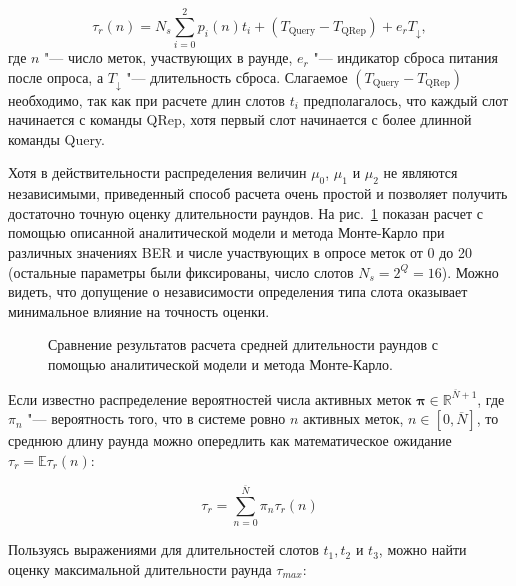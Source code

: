 \begin{equation}\label{eq:ch3_round_duration_of_n}
	\tau_r(n) = N_s \sum\limits_{i=0}^{2}p_i(n)t_i +
		(T_\text{Query} - T_\text{QRep}) +
		e_r T_\downarrow,
\end{equation}
где $n$ "--- число меток, участвующих в раунде, $e_r$ "--- индикатор сброса питания после опроса, а $T_\downarrow$ "--- длительность сброса. Слагаемое $(T_\text{Query} - T_\text{QRep})$ необходимо, так как при расчете длин слотов $t_i$ предполагалось, что каждый слот начинается с команды QRep, хотя первый слот начинается с более длинной команды Query.

Хотя в действительности распределения величин $\mu_0$, $\mu_1$ и $\mu_2$ не являются независимыми, приведенный способ расчета очень простой и позволяет получить достаточно точную оценку длительности раундов. На рис.~\ref{fig:ch3_round_durations_validation} показан расчет с помощью описанной аналитической модели и метода Монте-Карло при различных значениях BER и числе участвующих в опросе меток от 0 до 20 (остальные параметры были фиксированы, число слотов $N_s = 2^Q = 16$). Можно видеть, что допущение о независимости определения типа слота оказывает минимальное влияние на точность оценки.

\begin{figure}[htb]
	\caption[Валидация модели расчета средрней длительности раундов.]{Сравнение результатов расчета средней длительности раундов с помощью аналитической модели и метода Монте-Карло.}
	\label{fig:ch3_round_durations_validation}
\end{figure}


Если известно распределение вероятностей числа активных меток $\bm{\pi} \in \mathbb{R}^{\overline{N}+1}$, где $\pi_n$ "--- вероятность того, что в системе ровно $n$ активных меток, $n \in [0, \overline{N}]$, то среднюю длину раунда можно опередлить как математическое ожидание $\tau_r = \mathbb{E} \tau_r(n)$:

\begin{equation}\label{eq:ch3_round_duration_avg}
	\tau_r = \sum\limits_{n=0}^{\overline{N}} \pi_n \tau_r(n)
\end{equation}

Пользуясь выражениями для длительностей слотов $t_1, t_2$ и $t_3$, можно найти оценку максимальной длительности раунда $\tau_{max}$:

